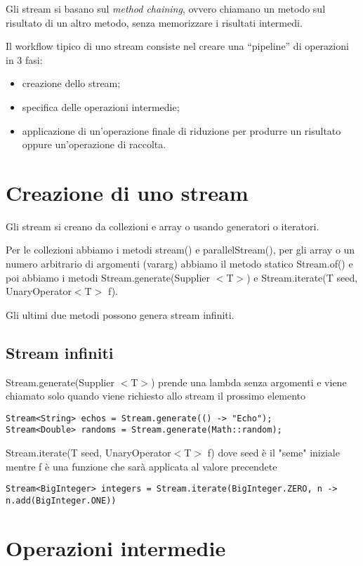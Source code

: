 Gli stream si basano sul \textit{method chaining}, ovvero chiamano un metodo sul risultato di un altro metodo, senza memorizzare i risultati intermedi.

Il workflow tipico di uno stream consiste nel creare una “pipeline” di operazioni in 3 fasi:
\begin{itemize}
    \item creazione dello stream;
    \item specifica delle operazioni intermedie;
    \item applicazione di un’operazione finale di riduzione per produrre un risultato oppure un'operazione di raccolta.
\end{itemize}

\section{Creazione di uno stream}

Gli stream si creano da collezioni e array o usando generatori o iteratori.

Per le collezioni abbiamo i metodi stream() e parallelStream(), per gli array o un numero arbitrario di argomenti (vararg) abbiamo il metodo statico\newline 
Stream.of() e poi abbiamo i metodi Stream.generate(Supplier $<$T$>$) e Stream.iterate(T seed, UnaryOperator$<$T$>$ f).

Gli ultimi due metodi possono genera stream infiniti.

\subsection{Stream infiniti}
Stream.generate(Supplier $<$T$>$) prende una lambda senza argomenti e viene chiamato solo quando viene richiesto allo stream il prossimo elemento
\begin{lstlisting}
Stream<String> echos = Stream.generate(() -> "Echo");
Stream<Double> randoms = Stream.generate(Math::random); 
\end{lstlisting}

Stream.iterate(T seed, UnaryOperator$<$T$>$ f) dove seed è il "seme" iniziale mentre f è una funzione che sarà applicata al valore precendete
\begin{lstlisting}
Stream<BigInteger> integers = Stream.iterate(BigInteger.ZERO, n -> n.add(BigInteger.ONE))   
\end{lstlisting}

\section{Operazioni intermedie}

